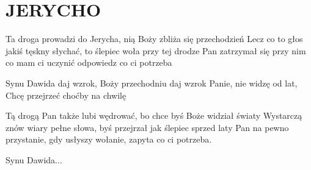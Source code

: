 \documentclass[../../../songbook.tex]{subfiles}
\begin{document}
\TabPositions{8cm} %
\section*{JERYCHO}
{}
\vspace{0.5cm}
Ta droga prowadzi do Jerycha,			 \newline
nią Boży zbliża się przechodzień		 \newline
Lecz co to głos jakiś tęskny słychać,	 \newline
to ślepiec woła przy tej drodze			 \newline
Pan zatrzymał się przy nim				 \newline
co mam ci uczynić odpowiedz 			 \newline
co ci potrzeba							 \newline

\-\hspace{1cm} Synu Dawida daj wzrok,			 \newline
\-\hspace{1cm} Boży przechodniu daj wzrok		 \newline
\-\hspace{1cm} Panie, nie widzę od lat,			 \newline
\-\hspace{1cm} Chcę przejrzeć choćby na chwilę	 \newline

Tą drogą Pan także lubi wędrować,  \newline
bo chce byś Boże widział światy \newline
Wystarczą znów wiary pełne słowa,  \newline
byś przejrzał jak ślepiec sprzed laty \newline
Pan na pewno przystanie, gdy usłyszy wołanie, \newline
zapyta co ci potrzeba.\newline

\-\hspace{1cm} Synu Dawida... \newline
\end{document}
